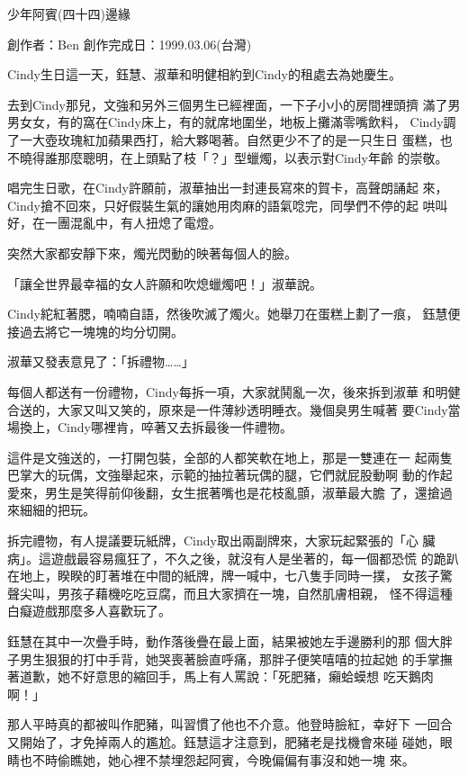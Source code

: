 



少年阿賓(四十四)邊緣

創作者：Ben
創作完成日：1999.03.06(台灣)


Cindy生日這一天，鈺慧、淑華和明健相約到Cindy的租處去為她慶生。

去到Cindy那兒，文強和另外三個男生已經裡面，一下子小小的房間裡頭擠
滿了男男女女，有的窩在Cindy床上，有的就席地圍坐，地板上攤滿零嘴飲料，
Cindy調了一大壺玫瑰紅加蘋果西打，給大夥喝著。自然更少不了的是一只生日
蛋糕，也不曉得誰那麼聰明，在上頭點了枝「？」型蠟燭，以表示對Cindy年齡
的崇敬。

唱完生日歌，在Cindy許願前，淑華抽出一封連長寫來的賀卡，高聲朗誦起
來，Cindy搶不回來，只好假裝生氣的讓她用肉麻的語氣唸完，同學們不停的起
哄叫好，在一團混亂中，有人扭熄了電燈。

突然大家都安靜下來，燭光閃動的映著每個人的臉。

「讓全世界最幸福的女人許願和吹熄蠟燭吧！」淑華說。

Cindy紽紅著腮，喃喃自語，然後吹滅了燭火。她舉刀在蛋糕上劃了一痕，
鈺慧便接過去將它一塊塊的均分切開。

淑華又發表意見了：「拆禮物……」

每個人都送有一份禮物，Cindy每拆一項，大家就鬨亂一次，後來拆到淑華
和明健合送的，大家又叫又笑的，原來是一件薄紗透明睡衣。幾個臭男生喊著
要Cindy當場換上，Cindy哪裡肯，啐著又去拆最後一件禮物。

這件是文強送的，一打開包裝，全部的人都笑軟在地上，那是一雙連在一
起兩隻巴掌大的玩偶，文強舉起來，示範的抽拉著玩偶的腿，它們就屁股動啊
動的作起愛來，男生是笑得前仰後翻，女生抿著嘴也是花枝亂顫，淑華最大膽
了，還搶過來細細的把玩。

拆完禮物，有人提議要玩紙牌，Cindy取出兩副牌來，大家玩起緊張的「心
臟病」。這遊戲最容易瘋狂了，不久之後，就沒有人是坐著的，每一個都恐慌
的跪趴在地上，睽睽的盯著堆在中間的紙牌，牌一喊中，七八隻手同時一撲，
女孩子驚聲尖叫，男孩子藉機吃吃豆腐，而且大家擠在一塊，自然肌膚相親，
怪不得這種白癡遊戲那麼多人喜歡玩了。

鈺慧在其中一次疊手時，動作落後疊在最上面，結果被她左手邊勝利的那
個大胖子男生狠狠的打中手背，她哭喪著臉直呼痛，那胖子便笑嘻嘻的拉起她
的手掌撫著道歉，她不好意思的縮回手，馬上有人罵說：「死肥豬，癩蛤蟆想
吃天鵝肉啊！」

那人平時真的都被叫作肥豬，叫習慣了他也不介意。他登時臉紅，幸好下
一回合又開始了，才免掉兩人的尷尬。鈺慧這才注意到，肥豬老是找機會來碰
碰她，眼睛也不時偷瞧她，她心裡不禁埋怨起阿賓，今晚偏偏有事沒和她一塊
來。

